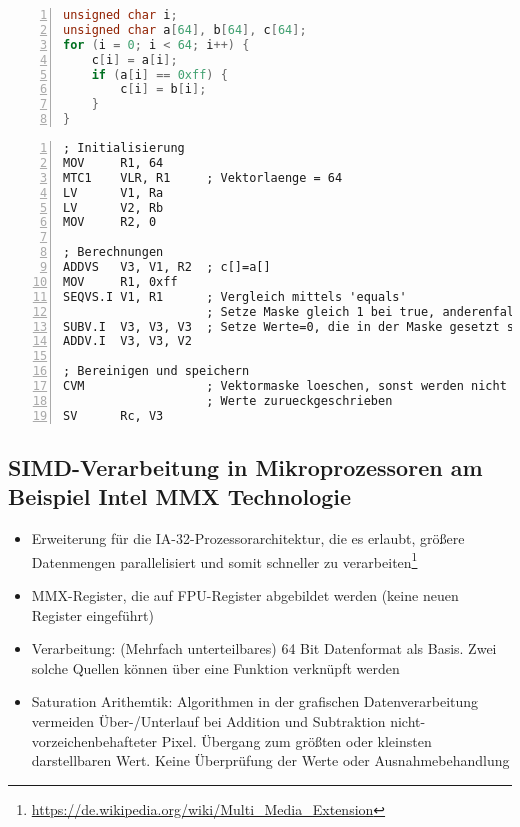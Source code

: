 \begin{itemize}
\begin{minipage}{\linewidth}
		\begin{lstlisting}[frame=single,numbers=left,mathescape,language=C,tabsize=4]
unsigned char i;
unsigned char a[64], b[64], c[64];
for (i = 0; i < 64; i++) {
	c[i] = a[i];
	if (a[i] == 0xff) {
		c[i] = b[i];
	}
}
		\end{lstlisting}
		\end{minipage}
		\begin{minipage}{\linewidth}
		\begin{lstlisting}[frame=single,numbers=left,mathescape,language={[mips]Assembler},tabsize=4]
; Initialisierung
MOV 	R1, 64
MTC1	VLR, R1		; Vektorlaenge = 64
LV 		V1, Ra
LV 		V2, Rb
MOV 	R2, 0

; Berechnungen
ADDVS 	V3, V1, R2 	; c[]=a[]
MOV 	R1, 0xff
SEQVS.I	V1, R1		; Vergleich mittels 'equals'
					; Setze Maske gleich 1 bei true, anderenfalls 0
SUBV.I 	V3, V3, V3  ; Setze Werte=0, die in der Maske gesetzt sind
ADDV.I 	V3, V3, V2

; Bereinigen und speichern
CVM					; Vektormaske loeschen, sonst werden nicht alle
					; Werte zurueckgeschrieben
SV 		Rc, V3
		\end{lstlisting}
		\end{minipage}
\end{itemize}

\subsection{SIMD-Verarbeitung in Mikroprozessoren am Beispiel Intel MMX Technologie}
\begin{itemize}
	\item Erweiterung für die IA-32-Prozessorarchitektur, die es erlaubt, größere Datenmengen parallelisiert und somit schneller zu verarbeiten\footnote{\url{https://de.wikipedia.org/wiki/Multi_Media_Extension}}
	\item MMX-Register, die auf FPU-Register abgebildet werden (keine neuen Register eingeführt)
	\item Verarbeitung: (Mehrfach unterteilbares) 64 Bit Datenformat als Basis. Zwei solche Quellen können über eine Funktion verknüpft werden
	\item Saturation Arithemtik: Algorithmen in der grafischen Datenverarbeitung vermeiden Über-/Unterlauf bei Addition und Subtraktion nicht-vorzeichenbehafteter Pixel. Übergang zum größten oder kleinsten darstellbaren Wert. Keine Überprüfung der Werte oder Ausnahmebehandlung
\end{itemize}

